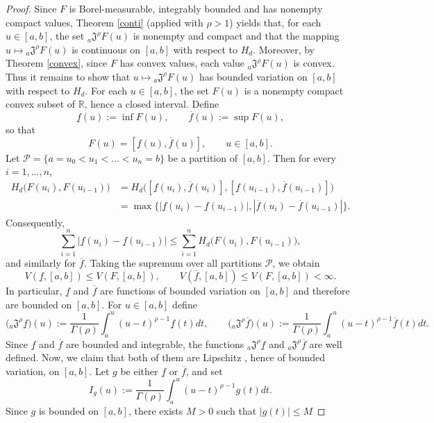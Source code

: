 \documentclass[a4paper,12pt,reqno]{amsart}
\numberwithin{equation}{section}
\theoremstyle{definition}
\theoremstyle{remark}
\numberwithin{equation}{section}
\begin{document}
\begin{proof}
Since $F$ is Borel-measurable, integrably bounded and has nonempty compact
values, Theorem \ref{conti} (applied with $\rho>1$) yields that, for each $u\in[a,b]$, the set ${}_{a}\mathfrak{J}^{\rho}F(u)$ is nonempty and compact and that the mapping $u\mapsto {}_{a}\mathfrak{J}^{\rho}F(u)$ is continuous on $[a,b]$ with respect to $H_d$. Moreover, by Theorem \ref{convex}, since $F$ has convex values, each value ${}_{a}\mathfrak{J}^{\rho}F(u)$ is convex. Thus it remains to show that $u\mapsto {}_{a}\mathfrak{J}^{\rho}F(u)$ has bounded variation on $[a,b]$ with respect to $H_d$.
For each $u\in[a,b]$, the set $F(u)$ is a nonempty compact convex subset of $\mathbb{R}$, hence a closed interval. Define
\[\underline f(u):=\inf F(u),\qquad \overline f(u):=\sup F(u), \]
so that
\[ F(u)=[\underline f(u),\overline f(u)], \qquad u\in[a,b].
\]
Let $\mathcal{P}=\{a=u_0<u_1<\dots<u_n=b\}$ be a partition of $[a,b]$. Then for every $i=1,\dots,n$,
\begin{align*}
    H_d\big(F(u_i),F(u_{i-1})\big) & =
H_d\big([\underline f(u_i),\overline f(u_i)],
        [\underline f(u_{i-1}),\overline f(u_{i-1})]\big) \\&  = \max\Big\{|\underline f(u_i)-\underline f(u_{i-1})|,
          |\overline f(u_i)-\overline f(u_{i-1})|\Big\}.
\end{align*}
Consequently,
\[ \sum_{i=1}^{n}|\underline f(u_i)-\underline f(u_{i-1})|
\le \sum_{i=1}^{n}H_d\big(F(u_i),F(u_{i-1})\big), \]
and similarly for $\overline f$. Taking the supremum over all partitions
$\mathcal{P}$, we obtain
\[ V(\underline f,[a,b])\le V(F,[a,b]),\qquad V(\overline f,[a,b])\le V(F,[a,b])<\infty. \]
In particular, $\underline f$ and $\overline f$ are functions of bounded variation on $[a,b]$ and therefore are bounded on $[a,b]$. For $u\in[a,b]$ define
\[ \big({}_{a}\mathfrak{J}^{\rho}\underline f\big)(u)
:= \frac{1}{\Gamma(\rho)}\int_{a}^{u}(u-t)^{\rho-1}\underline f(t)dt, \qquad
\big({}_{a}\mathfrak{J}^{\rho}\overline f\big)(u)
:= \frac{1}{\Gamma(\rho)}\int_{a}^{u}(u-t)^{\rho-1}\overline f(t)dt. \]
Since $\underline f$ and $\overline f$ are bounded and integrable, the functions ${}_{a}\mathfrak{J}^{\rho}\underline f$ and
${}_{a}\mathfrak{J}^{\rho}\overline f$ are well defined. Now, we claim that both of them are Lipschitz , hence of bounded variation, on $[a,b]$.
Let $g$ be either $\underline f$ or $\overline f$, and set
\[
I_g(u):=\frac{1}{\Gamma(\rho)}\int_{a}^{u}(u-t)^{\rho-1}g(t)dt.
\]
Since $g$ is bounded on $[a,b]$, there exists $M>0$ such that $|g(t)|\le M$

\end{proof}
\end{document}
